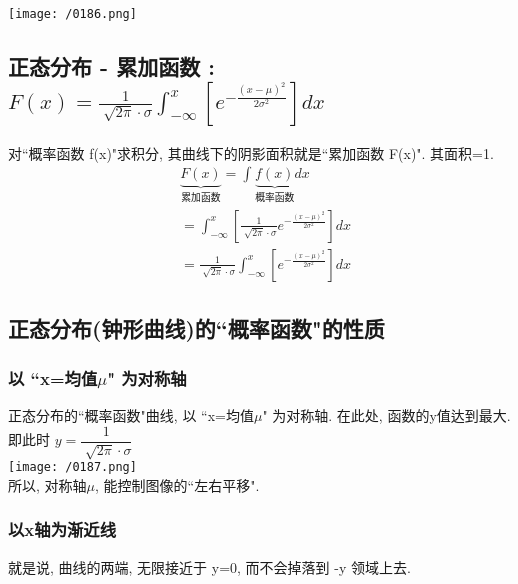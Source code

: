 \documentclass[UTF8]{ctexart}
\begin{document}
	\texttt{[image: /0186.png]} 
	
	
	
	
	\subsection{正态分布 - 累加函数 : $\boxed{
			F(x)=\frac{1}{\sqrt[]{2\pi}\cdot \sigma}\int_{-\infty}^x{\left[ e^{-\frac{(x-\mu )^2}{2\sigma ^2}} \right]}dx
		}$ }
	
	对``概率函数 f(x)"求积分, 其曲线下的阴影面积就是``累加函数 F(x)". 其面积=1. \\
	
	
	\begin{align*}  %
	&\underset{\text{累加函数}}{\underbrace{F(x)}}=\int_{}^{}{\underset{\text{概率函数}}{\underbrace{f(x)}}}dx\\
&=\int_{-\infty}^x{\left[ \frac{1}{\sqrt[]{2\pi}\cdot \sigma}e^{-\frac{(x-\mu )^2}{2\sigma ^2}} \right]}dx\\
&=\frac{1}{\sqrt[]{2\pi}\cdot \sigma}\int_{-\infty}^x{\left[ e^{-\frac{(x-\mu )^2}{2\sigma ^2}} \right]}dx
	\end{align*}



\vspace{1em} 
\subsection{正态分布(钟形曲线)的``概率函数"的性质}


\subsubsection{以 ``x=均值$\mu$" 为对称轴}

正态分布的``概率函数"曲线, 以 ``x=均值$\mu$" 为对称轴. 在此处, 函数的y值达到最大. 即此时 $y=\dfrac{1}{\sqrt[]{2\pi}\cdot \sigma}$ \\

\texttt{[image: /0187.png]} \\

所以, 对称轴$\mu$, 能控制图像的``左右平移". \\




\subsubsection{以x轴为渐近线}
就是说, 曲线的两端, 无限接近于 y=0, 而不会掉落到 -y 领域上去.
\end{document}
